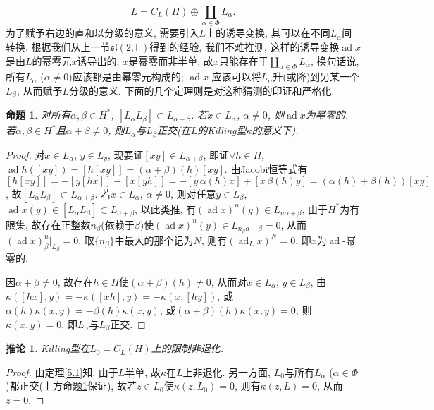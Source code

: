 \documentclass{ctexart}%
\newtheorem{proposition}{命题}
\newtheorem{corollary}{推论}
\theoremstyle{definition}
\theoremstyle{remark}
\DeclareMathOperator{\ad}{ad}
\begin{document}
$$L = C_L(H)\oplus \coprod_{\alpha \in \Phi}L_\alpha.$$
为了赋予右边的直和以分级的意义, 需要引入$L$上的诱导变换, 其可以在不同$L_\alpha$间转换. 根据我们从上一节$\mathfrak{sl}(2,\mathsf{F})$得到的经验, 我们不难推测, 这样的诱导变换$\ad x$是由$L$的幂零元$x$诱导出的; $x$是幂零而非半单, 故$x$只能存在于$\coprod_{\alpha \in\Phi} L_\alpha$, 换句话说, 所有$L_\alpha$ ($\alpha \neq 0$)应该都是由幂零元构成的; $\ad x$ 应该可以将$L_\alpha$升(或降)到另某一个$L_\beta$, 从而赋予$L$分级的意义. 下面的几个定理则是对这种猜测的印证和严格化. 

\begin{proposition}\label{8.1p}
对所有$\alpha,\beta \in H^*$, $[L_\alpha L_\beta]\subset L_{\alpha+\beta}$. 若$x\in L_\alpha$, $\alpha \neq0$, 则$\ad x$为幂零的. 若$\alpha,\beta\in H^*$且$\alpha+\beta \neq 0$, 则$L_\alpha$与$L_\beta$正交(在$L$的Killing型$\kappa$的意义下).
\end{proposition}
\begin{proof}
对$x\in L_\alpha$, $y\in L_y$, 现要证$[xy]\in L_{\alpha+\beta}$, 即证$\forall h\in H$, $
\ad h([xy])=[h[xy]]=(\alpha+\beta)(h)[xy]$. 由Jacobi恒等式有$[h[xy]]=-[y[hx]]-[x[yh]]=-[y\,\alpha(h)x]+[x\,\beta(h)y] = (\alpha(h)+\beta(h))[xy]$, 故$[L_\alpha L_\beta]\subset L_{\alpha+\beta}$. 若$x\in L_\alpha$, $\alpha \neq0$, 则对任意$y\in L_\beta$, $\ad x(y)\in [L_\alpha L_\beta]\subset L_{\alpha+\beta}$, 以此类推, 有$(\ad x)^n(y) \in L_{n\alpha+\beta}$, 由于$H^*$为有限集, 故存在正整数$n_\beta$(依赖于$\beta$)使$(\ad x)^n(y)\in L_{n_\beta\alpha+\beta}=0$, 从而 $(\ad x)^n_\beta|_{L_\beta}=0$, 取$\{n_\beta\}$中最大的那个记为$N$, 则有$(\ad_L x)^N=0$, 即$x$为$\ad$-幂零的. 

因$\alpha+\beta\neq 0$, 故存在$h\in H$使$(\alpha+\beta)(h)\neq0$, 从而对$x\in L_\alpha$, $y\in L_\beta$, 由$\kappa([hx],y)=-\kappa([xh],y)=-\kappa(x,[hy])$, 或$\alpha(h)\kappa(x,y)=-\beta(h)\kappa(x,y)$, 或$(\alpha+\beta)(h)\kappa(x,y)=0$, 则$\kappa(x,y)=0$, 即$L_\alpha$与$L_\beta$正交.
\end{proof}

\begin{corollary}\label{8.1c}
Killing型在$L_0=C_L(H)$上的限制非退化.
\end{corollary}
\begin{proof}
由定理\ref{5.1}知, 由于$L$半单, 故$\kappa$在$L$上非退化. 另一方面, $L_0$与所有$L_\alpha$ ($\alpha\in \Phi$)都正交(上方命题\ref{8.1p}保证), 故若$z\in L_0$使$\kappa(z,L_0)=0$, 则有$\kappa(z,L)=0$, 从而$z=0$.
\end{proof}
\end{document}
